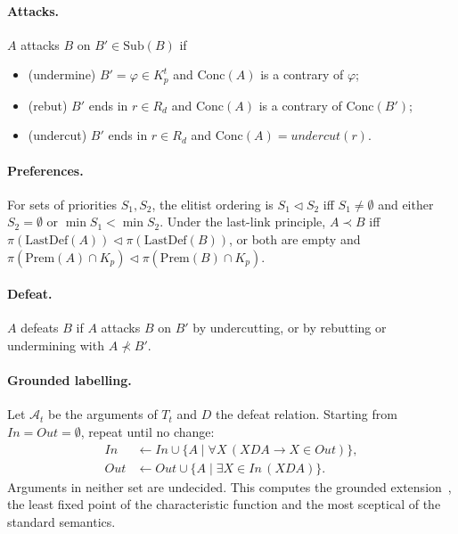 \documentclass[11pt]{article}
\newcommand{\Prem}{\mathrm{Prem}}
\newcommand{\Conc}{\mathrm{Conc}}
\newcommand{\Sub}{\mathrm{Sub}}
\newcommand{\Last}{\mathrm{LastDef}}
\begin{document}
\paragraph{Attacks.}
$A$ attacks $B$ on $B' \in \Sub(B)$ if
\begin{itemize}[nosep]
\item (undermine) $B' = \varphi \in K_p^t$ and $\Conc(A)$ is a contrary of $\varphi$;
\item (rebut) $B'$ ends in $r\in R_d$ and $\Conc(A)$ is a contrary of $\Conc(B')$;
\item (undercut) $B'$ ends in $r\in R_d$ and $\Conc(A)=\mathit{undercut}(r)$.
\end{itemize}

\paragraph{Preferences.}
For sets of priorities $S_1,S_2$, the elitist ordering is
$S_1 \lhd S_2$ iff $S_1 \neq \emptyset$ and either $S_2=\emptyset$ or
$\min S_1 < \min S_2$. Under the last-link principle, $A \prec B$ iff
$\pi(\Last(A)) \lhd \pi(\Last(B))$, or both are empty and
$\pi(\Prem(A)\cap K_p) \lhd \pi(\Prem(B)\cap K_p)$.

\paragraph{Defeat.}
$A$ defeats $B$ if $A$ attacks $B$ on $B'$ by undercutting, or by
rebutting or undermining with $A \not\prec B'$.

\paragraph{Grounded labelling.}
Let $\mathcal{A}_t$ be the arguments of $T_t$ and $D$ the defeat
relation. Starting from $\mathit{In}=\mathit{Out}=\emptyset$, repeat
until no change:
\[
\begin{aligned}
\mathit{In}  &\leftarrow \mathit{In}  \cup \{A \mid \forall X\,(X D A \rightarrow X\in\mathit{Out})\},\\
\mathit{Out} &\leftarrow \mathit{Out} \cup \{A \mid \exists X\in\mathit{In}\,(X D A)\}.
\end{aligned}
\]
Arguments in neither set are undecided. This computes the grounded
extension~\cite{dung}, the least fixed point of the characteristic
function and the most sceptical of the standard semantics.
\end{document}
